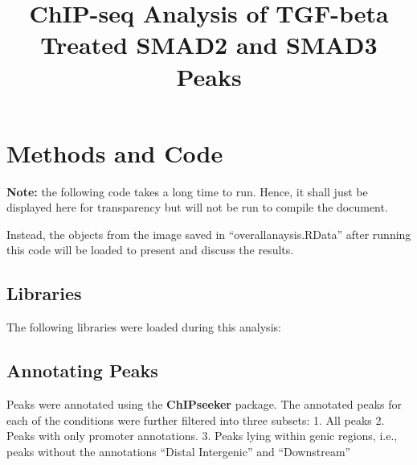 \documentclass[]{article}
\title{ChIP-seq Analysis of TGF-beta Treated SMAD2 and SMAD3 Peaks}
\author{}
\date{}
\begin{document}
\maketitle

\clearpage{}

\tableofcontents

\clearpage{}

\hypertarget{methods-and-code}{%
\section{Methods and Code}\label{methods-and-code}}

\textbf{Note:} the following code takes a long time to run. Hence, it
shall just be displayed here for transparency but will not be run to
compile the document.

Instead, the objects from the image saved in
``overall\textunderscore anaysis.RData'' after running this code will be
loaded to present and discuss the results.

\hypertarget{libraries}{%
\subsection{Libraries}\label{libraries}}

The following libraries were loaded during this analysis:

\hypertarget{annotating-peaks}{%
\subsection{Annotating Peaks}\label{annotating-peaks}}

Peaks were annotated using the \textbf{ChIPseeker} package. The
annotated peaks for each of the conditions were further filtered into
three subsets: 1. All peaks 2. Peaks with only promoter annotations. 3.
Peaks lying within genic regions, i.e., peaks without the annotations
``Distal Intergenic'' and ``Downstream''
\end{document}
